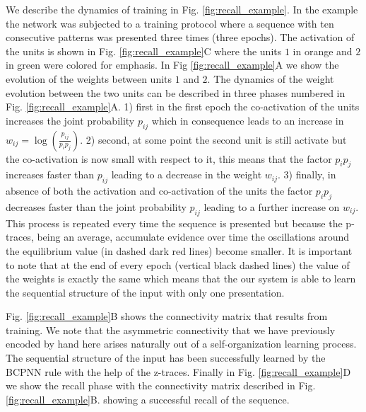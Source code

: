 \documentclass[10pt,a4paper]{article}
\begin{document}
We describe the dynamics of training in Fig. \ref{fig:recall_example}. In the example the network was subjected to a training protocol where a sequence with ten consecutive patterns was presented three times (three epochs). The activation of the units is shown in Fig. \ref{fig:recall_example}C where the units $1$ in orange and $2$ in green were colored for emphasis. In Fig \ref{fig:recall_example}A we show the evolution of the weights between units $1$ and $2$. The dynamics of the weight evolution between the two units can be described in three phases numbered in Fig. \ref{fig:recall_example}A. 1) first in the first epoch the co-activation of the units increases the joint probability $p_{ij}$ which in consequence leads to an increase in $w_{ij} = \log (\frac{p_{ij}}{p_i p_j})$. 2) second, at some point the second unit is still activate but the co-activation is now small with respect to it, this means that the factor $p_i p_j$ increases faster than $p_{ij}$ leading to a decrease in the weight $w_{ij}$. 3) finally, in absence of both the activation and co-activation of the units the factor $p_i p_j$ decreases faster than the joint probability $p_{ij}$ leading to a further increase on $w_{ij}$. This process is repeated every time the sequence is presented but because the p-traces, being an average, accumulate evidence over time the oscillations around the equilibrium value (in dashed dark red lines) become smaller. It is important to note that at the end of every epoch (vertical black dashed lines) the value of the weights is exactly the same which means that the our system is able to learn the sequential structure of the input with only one presentation. 

Fig. \ref{fig:recall_example}B shows the connectivity matrix that results from training. We note that the asymmetric connectivity that we have previously encoded by hand here arises naturally out of a self-organization learning process. The sequential structure of the input has been successfully learned by the BCPNN rule with the help of the z-traces. Finally in Fig. \ref{fig:recall_example}D we show the recall phase with the connectivity matrix described in Fig.\ref{fig:recall_example}B. showing a successful recall of the sequence. 
\end{document}
